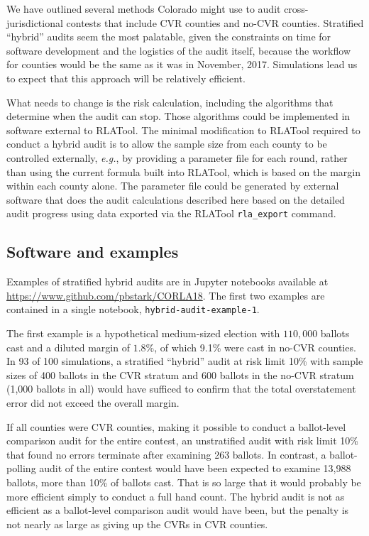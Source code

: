 \documentclass[runningheads]{llncs}
\begin{document}
We have outlined several methods Colorado might use to audit cross-jurisdictional contests
that include CVR counties and no-CVR counties.
Stratified ``hybrid'' audits seem the most palatable,
given the constraints on time for software development and the logistics
of the audit itself, because the workflow for counties would be the same
as it was in November, 2017.
Simulations lead us to expect that this approach will be relatively efficient.

What needs to change is the risk calculation, including the
algorithms that determine when the audit can stop.
Those algorithms could be implemented in software external to RLATool.
The minimal modification to RLATool required to conduct
a hybrid audit is to allow the sample size from each county to be controlled externally,
\emph{e.g.}, by providing a parameter file for each round,
rather than using the current formula built into RLATool, 
which is based on the margin within each county alone.
The parameter file could be generated by external software that does the
audit calculations described here based on the detailed
audit progress using data exported via the RLATool \texttt{rla\_export} command.


\subsection{Software and examples}
Examples of stratified hybrid audits are in Jupyter notebooks available
at \url{https://www.github.com/pbstark/CORLA18}.
The first two examples are contained in a single notebook, \texttt{hybrid-audit-example-1}.

The first example is a hypothetical medium-sized election with 
$110,000$ ballots cast and a diluted margin of $1.8\%$, of which 
9.1\% were cast in no-CVR counties. 
In 93 of 100 simulations, a stratified ``hybrid'' audit at risk limit 10\% with sample sizes of 400 ballots 
in the CVR stratum and 600 ballots in the no-CVR stratum
(1,000 ballots in all)
would have sufficed to confirm that the total overstatement error did not exceed the overall margin.

If all counties were CVR counties, making it possible to conduct a ballot-level comparison audit for the entire contest, an unstratified audit with risk limit 10\% that found no errors terminate 
after examining 263 ballots.
In contrast, a ballot-polling audit of the entire contest would have been expected to examine
13,988 ballots, more than 10\% of ballots cast.
That is so large that it would probably be more efficient simply to conduct a full hand count.
The hybrid audit is not as efficient as a ballot-level comparison audit would have been, but the penalty
is not nearly as large as giving up the CVRs in CVR counties.
\end{document}
